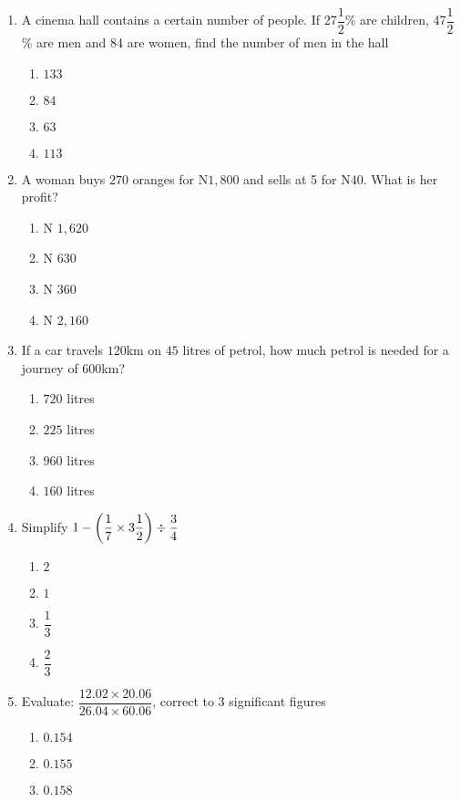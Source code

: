 \begin{multicols}{2}
\begin{enumerate}[label={\arabic*.}]
\begin{enumerate}[label={\Alph*.}]
    \end{enumerate}
\item A cinema hall contains a certain number of people. If 27\(\dfrac{1}{2}\)\% are children, 47\(\dfrac{1}{2}\)\% are men and 84 are 
women, find the number of men in the hall
    \begin{enumerate}[label={\Alph*.}]
    \item \(133\)
    \item \(84\)
    \item \(63\)
    \item \(113\)
    \end{enumerate}
\item A woman buys \(270\) oranges for N\(1,800\) and sells at 5 for N\(40\). What is her profit?
    \begin{enumerate}[label={\Alph*.}]
    \item N \(1,620\)
    \item N \(630\)
    \item N \(360\)
    \item N \(2,160\)
    \end{enumerate}
\item If a car travels \(120\)km on \(45\) litres of petrol, how much petrol is needed for a journey of \(600\)km?
    \begin{enumerate}[label={\Alph*.}]
    \item \(720\) litres
    \item \(225\) litres
    \item \(960\) litres
    \item \(160\) litres
    \end{enumerate}
\item Simplify \(1 - \left(\dfrac{1}{7} \times 3\dfrac{1}{2}\right) \divisionsymbol \dfrac{3}{4}\)
    \begin{enumerate}[label={\Alph*.}]
    \item \(2\)
    \item \(1\)
    \item \(\dfrac{1}{3}\)
    \item \(\dfrac{2}{3}\)
    \end{enumerate}
\item Evaluate: \(\dfrac{12.02 \times 20.06}{26.04 \times 60.06}\), correct to 3 significant figures
    \begin{enumerate}[label={\Alph*.}]
    \item \(0.154\)
    \item \(0.155\)
    \item \(0.158\)

\end{enumerate}
\end{enumerate}
\end{multicols}
